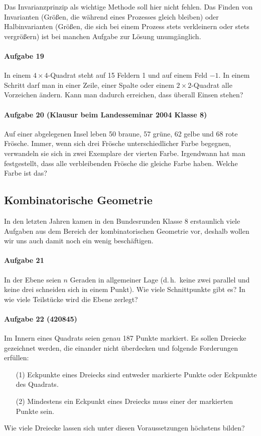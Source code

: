 \documentclass[11pt,a4paper]{article}
\begin{document}
Das Invarianzprinzip als wichtige Methode soll hier nicht fehlen. Das Finden
von Invarianten (Größen, die während eines Prozesses gleich bleiben) oder
Halbinvarianten (Größen, die sich bei einem Prozess stets verkleinern oder
stets vergrößern) ist bei manchen Aufgabe zur Lösung unumgänglich.

\paragraph{Aufgabe 19} 
In einem $4\times 4$-Quadrat steht auf 15 Feldern 1 und auf einem Feld $-1$.
In einem Schritt darf man in einer Zeile, einer Spalte oder einem $2\times
2$-Quadrat alle Vorzeichen ändern. Kann man dadurch erreichen, dass überall
Einsen stehen?

\paragraph{Aufgabe 20 (Klausur beim Landesseminar 2004 Klasse 8)} 
Auf einer abgelegenen Insel leben 50 braune, 57 grüne, 62 gelbe und 68 rote
Frösche. Immer, wenn sich drei Frösche unterschiedlicher Farbe begegnen,
verwandeln sie sich in zwei Exemplare der vierten Farbe. Irgendwann hat man
festgestellt, dass alle verbleibenden Frösche die gleiche Farbe haben. Welche
Farbe ist das?

\subsection*{Kombinatorische Geometrie}

In den letzten Jahren kamen in den Bundesrunden Klasse 8 erstaunlich viele
Aufgaben aus dem Bereich der kombinatorischen Geometrie vor, deshalb wollen
wir uns auch damit noch ein wenig beschäftigen.

\paragraph{Aufgabe 21} 
In der Ebene seien $n$ Geraden in allgemeiner Lage (d.\,h.\ keine zwei
parallel und keine drei schneiden sich in einem Punkt). Wie viele
Schnittpunkte gibt es? In wie viele Teilstücke wird die Ebene zerlegt?

\paragraph{Aufgabe 22 (420845)} 
Im Innern eines Quadrats seien genau 187 Punkte markiert. Es sollen Dreiecke
gezeichnet werden, die einander nicht überdecken und folgende Forderungen
erfüllen:
\begin{itemize}
\item[(1)] Eckpunkte eines Dreiecks sind entweder markierte Punkte oder
  Eckpunkte des Quadrats.
\item[(2)] Mindestens ein Eckpunkt eines Dreiecks muss einer der markierten
  Punkte sein.
\end{itemize}
Wie viele Dreiecke lassen sich unter diesen Voraussetzungen höchstens bilden?
\end{document}
